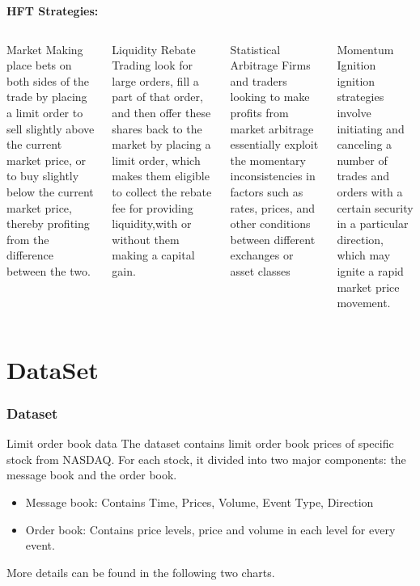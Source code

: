 \documentclass[xcolor={x11names,svgnames,dvipsnames}]{beamer}
\begin{document}
\begin{frame}

\textbf{\large{HFT Strategies:}}

\begin{columns}
\column{2.4in}
\begin{block}{Market Making}
\small{place bets on both sides of the trade by placing a limit order to
sell slightly above the current market price, or to buy slightly below the current
market price, thereby profiting from the difference between the two. }
\end{block}
\begin{block}{Liquidity Rebate Trading
 }
\small{look for large orders, fill a
part of that order, and then offer these shares back to the market by placing a limit order, which makes them eligible to collect the rebate fee for providing liquidity,with or without them making a capital gain.}
\end{block}
\column{2.5in}
\begin{block}{\alert{Statistical Arbitrage}}
\small{Firms and traders looking to make profits from market arbitrage essentially exploit
 the momentary inconsistencies in factors such as rates, prices, and other conditions
 between different exchanges or asset classes}
\end{block}
\begin{block}{Momentum Ignition }
\small{ignition strategies involve initiating and canceling a number of trades and orders with a certain security in a particular direction, which may ignite a rapid market price movement.}
\end{block}
\end{columns}
\end{frame}

\section{DataSet}
\begin{frame}
\frametitle{Dataset}
\begin{block}{Limit order book data}
The dataset contains limit order book prices of specific stock from NASDAQ. For each stock, it divided into two major components: the message book and the order book.\\
\begin{itemize}
\item Message book: Contains Time, Prices, Volume, Event Type, Direction

\item Order book: Contains price levels, price and volume in each level for every event.  	
\end{itemize}
More details can be found in the following two charts.
\end{block} 

\end{frame}
\end{document}
